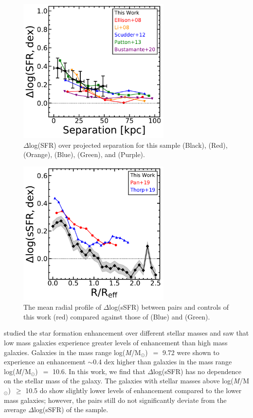 \documentclass[iop,revtex4,twocolumn,apj,numberedappendix,appendixfloats]{emulateapj}
\newcommand{\logm}{log({\it M}/M$_{\odot}$)}
\begin{document}
\begin{figure}
\centering
\includegraphics[width=3in]{fig/nuc_sep.pdf}
\caption[]{$\Delta$log(SFR) over projected separation for this sample (Black), \citet{Ellison:2008} (Red), \citet{Li:2008} (Orange), \citet{Scudder:2012} (Blue), \citet{Patton:2013} (Green), and \citet{Bustamante:2020} (Purple).  }
\label{fig:nuc_sep}
\end{figure}

\begin{figure}
\centering
\includegraphics[width=3in]{fig/prof_comp.pdf}
\caption[]{The mean radial profile of $\Delta$log(sSFR) between pairs and controls of this work (red) compared against those of \citet{Pan:2019} (Blue) and \citet{Thorp:2019} (Green).}
\label{fig:prof_comp}
\end{figure}

\citet{Li:2008} studied the star formation enhancement over different stellar masses and saw that low mass galaxies experience greater levels of enhancement than high mass galaxies.  Galaxies in the mass range \logm\ $=$ 9.72 were shown to experience an enhancement $\sim$0.4 dex higher than galaxies in the mass range \logm\ $=$ 10.6. In this work, we find that $\Delta$log(sSFR) has no dependence on the stellar mass of the galaxy. The galaxies with stellar masses above \logm\ $\ge$ 10.5 do show slightly lower levels of enhancement compared to the lower mass galaxies; however, the pairs still do not significantly deviate from the average $\Delta$log(sSFR) of the sample.
\end{document}
